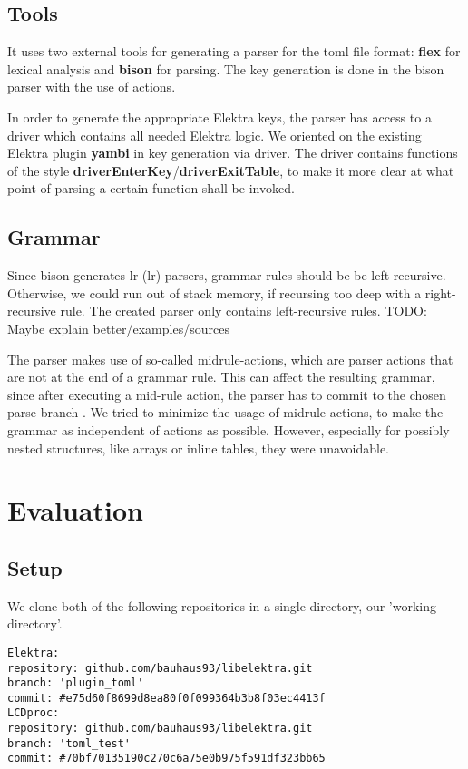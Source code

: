 \documentclass[12pt]{report}
\begin{document}
\section{Tools}
It uses two external tools for generating a parser for the toml file format: \textbf{\acrshort{flex}} \cite{flexgit} for lexical analysis and \textbf{bison} \cite{bisonmain} for parsing.
The key generation is done in the bison parser with the use of actions.

In order to generate the appropriate Elektra keys, the parser has access to a driver which contains all needed Elektra logic.
We oriented on the existing Elektra plugin \textbf{yambi}\cite{elektrayambi} in key generation via driver.
The driver contains functions of the style \textbf{driverEnterKey}/\textbf{driverExitTable}, to make it more clear at what point of parsing a certain function shall be invoked.

\section{Grammar}
Since bison generates \acrshort{lr} (\acrlong{lr}) parsers, grammar rules should be be left-recursive.
Otherwise, we could run out of stack memory, if recursing too deep with a right-recursive rule.
The created parser only contains left-recursive rules.
TODO: Maybe explain better/examples/sources

The parser makes use of so-called midrule-actions, which are parser actions that are not at the end of a grammar rule.
This can affect the resulting grammar, since after executing a mid-rule action, the parser has to commit to the chosen parse branch \cite{bisonmidruleconflicts}.
We tried to minimize the usage of midrule-actions, to make the grammar as independent of actions as possible.
However, especially for possibly nested structures, like arrays or inline tables, they were unavoidable.

\chapter{Evaluation}

\section{Setup}
We clone both of the following repositories in a single directory, our 'working directory'.
\begin{tcolorbox}
\begin{verbatim}
Elektra:
repository: github.com/bauhaus93/libelektra.git
branch: 'plugin_toml'
commit: #e75d60f8699d8ea80f0f099364b3b8f03ec4413f
LCDproc:
repository: github.com/bauhaus93/libelektra.git
branch: 'toml_test'
commit: #70bf70135190c270c6a75e0b975f591df323bb65
\end{verbatim}
\end{tcolorbox}
\end{document}
